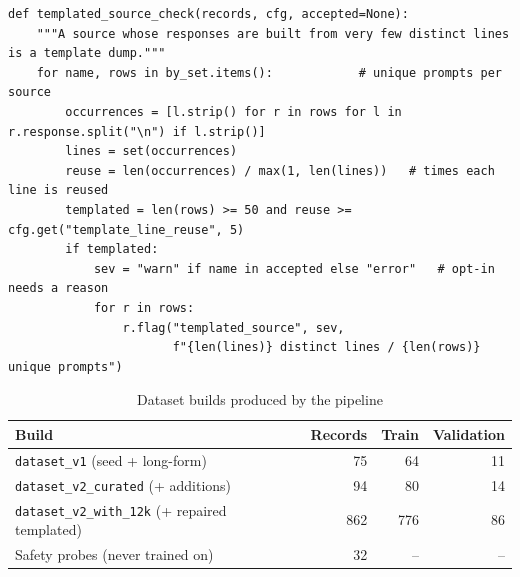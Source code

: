 \documentclass[11pt,a4paper]{article}
\newcommand{\code}[1]{\texttt{#1}}
\begin{document}
\par\noindent\begin{minipage}{\linewidth}\begin{lstlisting}[caption={Detecting templated data by line reuse (\code{nbllm/quality.py}, shortened).},label={lst:templ}]
def templated_source_check(records, cfg, accepted=None):
    """A source whose responses are built from very few distinct lines is a template dump."""
    for name, rows in by_set.items():            # unique prompts per source
        occurrences = [l.strip() for r in rows for l in r.response.split("\n") if l.strip()]
        lines = set(occurrences)
        reuse = len(occurrences) / max(1, len(lines))   # times each line is reused
        templated = len(rows) >= 50 and reuse >= cfg.get("template_line_reuse", 5)
        if templated:
            sev = "warn" if name in accepted else "error"   # opt-in needs a reason
            for r in rows:
                r.flag("templated_source", sev,
                       f"{len(lines)} distinct lines / {len(rows)} unique prompts")
\end{lstlisting}\end{minipage}\par

\begin{table}[H]
\centering
\caption{Dataset builds produced by the pipeline}
\label{tab:builds}
\small
\begin{tabular}{@{}lrrr@{}}
\toprule
\textbf{Build} & \textbf{Records} & \textbf{Train} & \textbf{Validation}\\
\midrule
\code{dataset\_v1} (seed + long-form) & 75 & 64 & 11\\
\code{dataset\_v2\_curated} (+ additions) & 94 & 80 & 14\\
\code{dataset\_v2\_with\_12k} (+ repaired templated) & 862 & 776 & 86\\
\midrule
Safety probes (never trained on) & 32 & -- & --\\
\bottomrule
\end{tabular}
\end{table}
\end{document}

